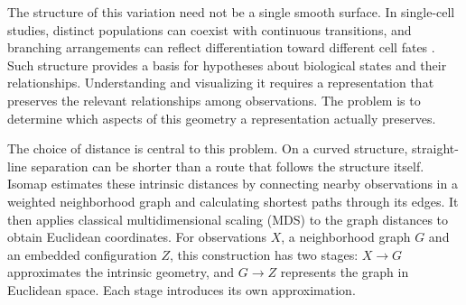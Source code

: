 \documentclass[11pt]{article}
\begin{document}
The structure of this variation need not be a single smooth surface. In
single-cell studies, distinct populations can coexist with continuous
transitions, and branching arrangements can reflect differentiation toward
different cell fates \citep{wolf2019paga}. Such structure provides a basis for
hypotheses about biological states and their relationships. Understanding
and visualizing it requires a representation that preserves the relevant
relationships among observations. The problem is to determine which aspects
of this geometry a representation actually preserves.

The choice of distance is central to this problem. On a curved structure,
straight-line separation can be shorter than a route that follows the
structure itself. Isomap \citep{tenenbaum2000global} estimates these intrinsic
distances by connecting nearby observations in a weighted neighborhood graph
and calculating shortest paths through its edges. It then applies classical
multidimensional scaling (MDS) to the graph distances to obtain Euclidean
coordinates. For observations $X$, a neighborhood graph $G$ and an embedded
configuration $Z$, this construction has two stages: $X\to G$ approximates
the intrinsic geometry, and $G\to Z$ represents the graph in Euclidean space.
Each stage introduces its own approximation.

\begin{center}
\end{center}
\end{document}
